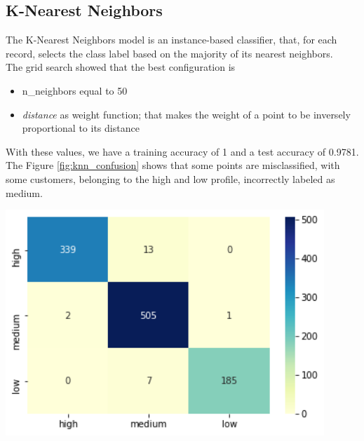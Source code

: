 \subsection{K-Nearest Neighbors}
\begin{minipage}{0.59\textwidth}
The K-Nearest Neighbors model is an instance-based classifier, that, for each record, selects the class label based on the majority of its nearest neighbors.\\
The grid search showed that the best configuration is
\begin{itemize}
\item n\_neighbors equal to 50
\item \emph{distance} as weight function; that makes the weight of a point to be inversely proportional to its distance
\end{itemize}

With these values, we have a training accuracy of 1 and a test accuracy of 0.9781.
The Figure \ref{fig:knn_confusion} shows that some points are misclassified, with some customers, belonging to the high and low profile, incorrectly labeled as medium.
\end{minipage}
\begin{minipage}{0.4\textwidth}
\centering
\includegraphics[width=0.90\textwidth]{img/knn_confusion.png}
\captionsetup{justification=centering}
\label{fig:knn_confusion}
\end{minipage}

